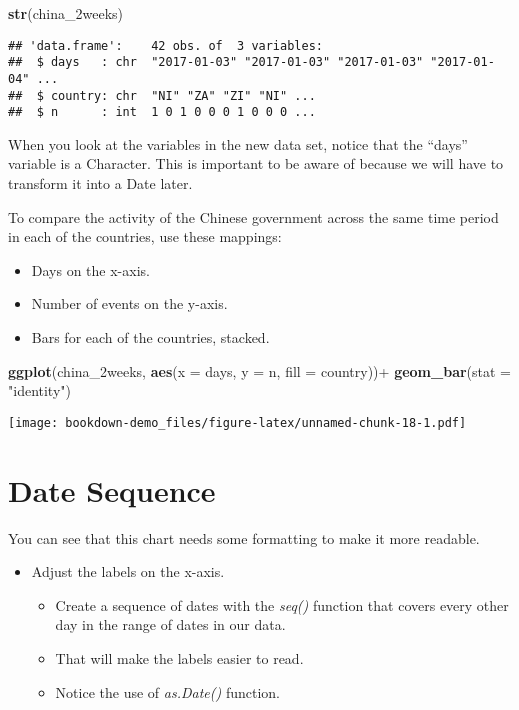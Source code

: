 \documentclass[]{book}
\newenvironment{Shaded}{\begin{snugshade}}{\end{snugshade}}
\newcommand{\KeywordTok}[1]{\textcolor[rgb]{0.13,0.29,0.53}{\textbf{{#1}}}}
\newcommand{\DataTypeTok}[1]{\textcolor[rgb]{0.13,0.29,0.53}{{#1}}}
\newcommand{\StringTok}[1]{\textcolor[rgb]{0.31,0.60,0.02}{{#1}}}
\newcommand{\NormalTok}[1]{{#1}}
\providecommand{\tightlist}{%
  \setlength{\itemsep}{0pt}\setlength{\parskip}{0pt}}
\theoremstyle{definition}
\theoremstyle{definition}
\theoremstyle{remark}
\begin{document}
\begin{Shaded}
\begin{Highlighting}[]
\KeywordTok{str}\NormalTok{(china_2weeks)}
\end{Highlighting}
\end{Shaded}

\begin{verbatim}
## 'data.frame':    42 obs. of  3 variables:
##  $ days   : chr  "2017-01-03" "2017-01-03" "2017-01-03" "2017-01-04" ...
##  $ country: chr  "NI" "ZA" "ZI" "NI" ...
##  $ n      : int  1 0 1 0 0 0 1 0 0 0 ...
\end{verbatim}

When you look at the variables in the new data set, notice that the
``days'' variable is a Character. This is important to be aware of
because we will have to transform it into a Date later.

To compare the activity of the Chinese government across the same time
period in each of the countries, use these mappings:

\begin{itemize}
\item
  Days on the x-axis.
\item
  Number of events on the y-axis.
\item
  Bars for each of the countries, stacked.
\end{itemize}

\begin{Shaded}
\begin{Highlighting}[]
\KeywordTok{ggplot}\NormalTok{(china_2weeks, }\KeywordTok{aes}\NormalTok{(}\DataTypeTok{x =} \NormalTok{days, }\DataTypeTok{y =} \NormalTok{n, }\DataTypeTok{fill =} \NormalTok{country))+}
\StringTok{  }\KeywordTok{geom_bar}\NormalTok{(}\DataTypeTok{stat =} \StringTok{"identity"}\NormalTok{)}
\end{Highlighting}
\end{Shaded}

\texttt{[image: bookdown-demo\_files/figure-latex/unnamed-chunk-18-1.pdf]}

\section{Date Sequence}\label{date-sequence}

You can see that this chart needs some formatting to make it more
readable.

\begin{itemize}
\tightlist
\item
  Adjust the labels on the x-axis.

  \begin{itemize}
  \tightlist
  \item
    Create a sequence of dates with the \emph{seq()} function that
    covers every other day in the range of dates in our data.\\
  \item
    That will make the labels easier to read.\\
  \item
    Notice the use of \emph{as.Date()} function.
  \end{itemize}
\end{itemize}
\end{document}
